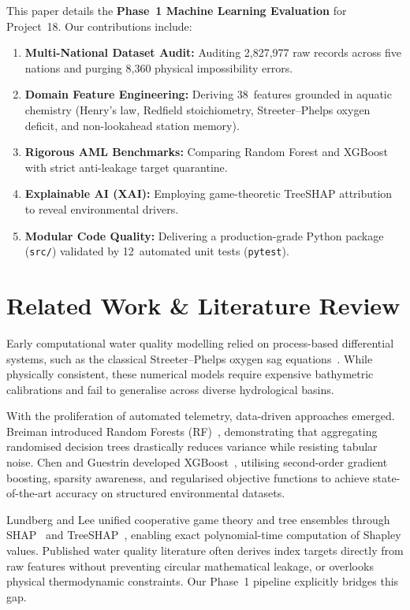 \documentclass[conference]{IEEEtran}
\begin{document}
This paper details the \textbf{Phase~1 Machine Learning Evaluation} for
Project~18. Our contributions include:
\begin{enumerate}
  \item \textbf{Multi-National Dataset Audit:} Auditing 2,827,977 raw
        records across five nations and purging 8,360 physical
        impossibility errors.
  \item \textbf{Domain Feature Engineering:} Deriving 38~features
        grounded in aquatic chemistry (Henry's law, Redfield
        stoichiometry, Streeter--Phelps oxygen deficit, and non-lookahead
        station memory).
  \item \textbf{Rigorous AML Benchmarks:} Comparing Random Forest and
        XGBoost with strict anti-leakage target quarantine.
  \item \textbf{Explainable AI (XAI):} Employing game-theoretic
        TreeSHAP attribution to reveal environmental drivers.
  \item \textbf{Modular Code Quality:} Delivering a production-grade
        Python package (\texttt{src/}) validated by 12~automated unit
        tests (\texttt{pytest}).
\end{enumerate}

\section{Related Work \& Literature Review}
\label{sec:related}

Early computational water quality modelling relied on process-based
differential systems, such as the classical Streeter--Phelps oxygen sag
equations~\cite{streeter1925study}. While physically consistent, these
numerical models require expensive bathymetric calibrations and fail to
generalise across diverse hydrological basins.

With the proliferation of automated telemetry, data-driven approaches
emerged. Breiman introduced Random Forests (RF)~\cite{breiman2001random},
demonstrating that aggregating randomised decision trees drastically
reduces variance while resisting tabular noise. Chen and Guestrin
developed XGBoost~\cite{chen2016xgboost}, utilising second-order
gradient boosting, sparsity awareness, and regularised objective
functions to achieve state-of-the-art accuracy on structured
environmental datasets.

Lundberg and Lee unified cooperative game theory and tree ensembles
through SHAP~\cite{lundberg2017unified} and TreeSHAP~\cite{lundberg2020from},
enabling exact polynomial-time computation of Shapley values. Published
water quality literature often derives index targets directly from raw
features without preventing circular mathematical leakage, or overlooks
physical thermodynamic constraints. Our Phase~1 pipeline explicitly
bridges this gap.
\end{document}
